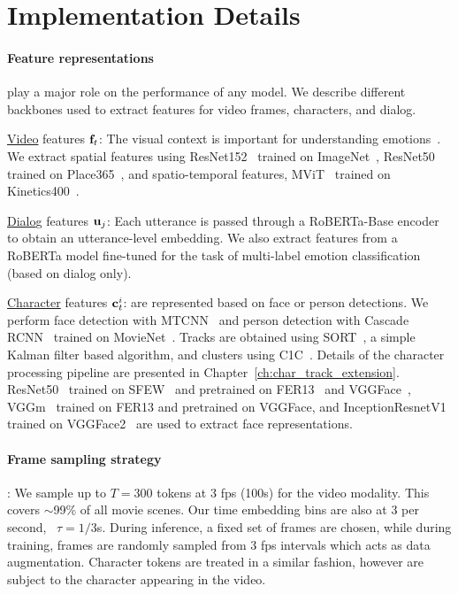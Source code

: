\section{Implementation Details}
\label{sec:impl}
\paragraph{Feature representations}
\label{subsec:exp:impl:feat_ext}
play a major role on the performance of any model.
We describe different backbones used to extract features for video frames, characters, and dialog.

\underline{Video} features $\mathbf{f}_t$:
The visual context is important for understanding emotions~\cite{emotic, caer, emoticon}.
We extract spatial features using ResNet152~\cite{resnet} trained on ImageNet~\cite{imagenet},
ResNet50~\cite{resnet} trained on Place365~\cite{places365}, and
spatio-temporal features, MViT~\cite{FanMViT2021} trained on Kinetics400~\cite{CarreiraQuoVadis2017}.

\underline{Dialo}g features $\mathbf{u}_j$:
Each utterance is passed through a RoBERTa-Base encoder~\cite{roberta} to obtain an utterance-level embedding.
We also extract features from a RoBERTa model fine-tuned for the task of multi-label emotion classification (based on dialog only).

\underline{Character} features $\mathbf{c}_t^i$:
are represented based on face or person detections.
We perform face detection with MTCNN~\cite{mtcnn} and person detection with Cascade RCNN~\cite{cascadercnn} trained on MovieNet~\cite{movienet}.
Tracks are obtained using SORT~\cite{sort}, a simple Kalman filter based algorithm, and clusters using C1C~\cite{c1c}.
Details of the character processing pipeline are presented in Chapter~\ref{ch:char_track_extension}. 
ResNet50~\cite{facefeat} trained on SFEW~\cite{sfew} and pretrained on FER13~\cite{fer13} and VGGFace~\cite{vggface},
VGGm~\cite{facefeat} trained on FER13 and pretrained on VGGFace, and InceptionResnetV1~\cite{SzegedyInceptionNet2015} trained on VGGFace2~\cite{CaoVGGF22018} are used to extract face representations.

\paragraph{Frame sampling strategy}:
We sample up to $T {=} 300$ tokens at 3 fps (100s) for the video modality.
This covers $\sim$99\%
of all movie scenes.
Our time embedding bins are also at 3 per second, \ie~$\tau {=} 1/3$s.
During inference, a fixed set of frames are chosen, while during training, frames are randomly sampled from 3 fps intervals which acts as data augmentation.
Character tokens are treated in a similar fashion, however are subject to the character appearing in the video.

